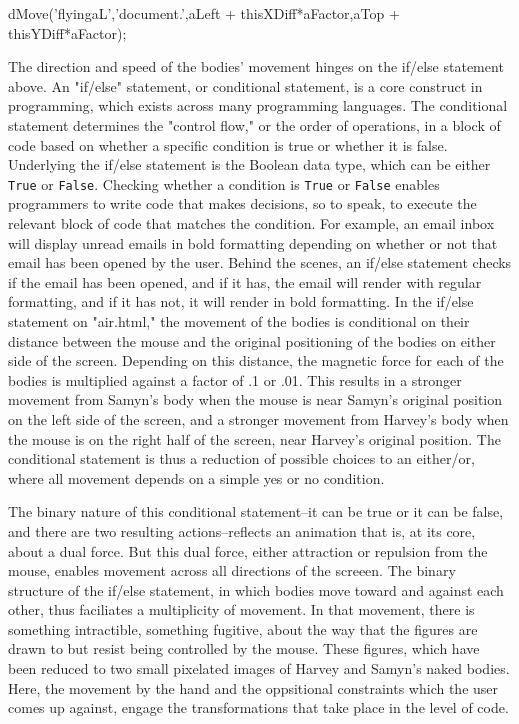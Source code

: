 \documentclass[11pt]{article}
\begin{document}
\begin{enumerate}
\begin{SOURCE}
dMove('flyingaL','document.',aLeft + thisXDiff*aFactor,aTop + thisYDiff*aFactor);
\end{SOURCE}
The direction and speed of the bodies' movement hinges on the if/else
statement above. An "if/else" statement, or conditional statement, is
a core construct in programming, which exists across many programming
languages. The conditional statement determines the "control flow," or
the order of operations, in a block of code based on whether a
specific condition is true or whether it is false. Underlying the
if/else statement is the Boolean data type, which can be either \texttt{True}
or \texttt{False}. Checking whether a condition is \texttt{True} or \texttt{False} enables
programmers to write code that makes decisions, so to speak, to
execute the relevant block of code that matches the condition. For
example, an email inbox will display unread emails in bold formatting
depending on whether or not that email has been opened by the
user. Behind the scenes, an if/else statement checks if the email has
been opened, and if it has, the email will render with regular
formatting, and if it has not, it will render in bold formatting. In
the if/else statement on "air.html," the movement of the bodies is
conditional on their distance between the mouse and the original
positioning of the bodies on either side of the screen. Depending on
this distance, the magnetic force for each of the bodies is multiplied
against a factor of .1 or .01. This results in a stronger movement
from Samyn's body when the mouse is near Samyn's original position on
the left side of the screen, and a stronger movement from Harvey's
body when the mouse is on the right half of the screen, near Harvey's
original position. The conditional statement is thus a reduction of
possible choices to an either/or, where all movement depends on a
simple yes or no condition.

The binary nature of this conditional statement--it can be true or it
can be false, and there are two resulting actions--reflects an
animation that is, at its core, about a dual force. But this dual
force, either attraction or repulsion from the mouse, enables movement
across all directions of the screeen. The binary structure of the
if/else statement, in which bodies move toward and against each other,
thus faciliates a multiplicity of movement. In that movement, there is
something intractible, something fugitive, about the way that the
figures are drawn to but resist being controlled by the mouse. These
figures, which have been reduced to two small pixelated images of
Harvey and Samyn's naked bodies. Here, the movement by the hand and
the oppsitional constraints which the user comes up against, engage
the transformations that take place in the level of code.


\end{enumerate}
\end{document}
